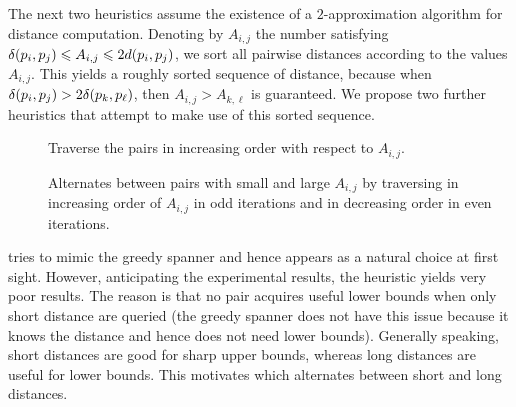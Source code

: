 \documentclass[a4paper,UKenglish,cleveref, autoref]{lipics-v2019}
\begin{document}
The next two heuristics assume the existence of a $2$-approximation algorithm for distance
computation. Denoting by $A_{i,j}$ the number satisfying $\delta(p_i,p_j)\leqslant A_{i,j}\leqslant 2 d(p_i,p_j)$,
we sort all pairwise distances according to the values $A_{i,j}$.
This yields a roughly sorted sequence of distance, because when $\delta(p_i,p_j)>2\delta(p_k,p_\ell)$,
then $A_{i,j}>A_{k,\ell}$ is guaranteed.
We propose two further heuristics that attempt to make use of this sorted sequence.
\begin{description}
\item [\bqsgrdy] Traverse the pairs in increasing order with respect to $A_{i,j}$.
\item [\bqsshaker] Alternates between pairs with small and large $A_{i,j}$
by traversing in increasing order of $A_{i,j}$ in odd iterations and in decreasing order
in even iterations.
\end{description}

\bqsgrdy tries to mimic the greedy spanner and hence appears as a natural
choice at first sight. However, anticipating the experimental results, the heuristic yields very poor
results. The reason is that no pair acquires useful lower bounds when only short distance are queried
(the greedy spanner does not have this issue because it knows the distance and hence does not need
lower bounds).
Generally speaking, short distances are good for sharp upper bounds, whereas long distances are
useful for lower bounds. This motivates \bqsshaker
which alternates between short and long distances.
\end{document}
